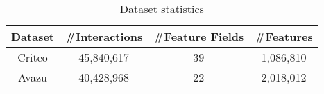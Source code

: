 \begin{table}[t]
    \caption{Dataset statistics}
    \centering
    \vspace{-0.2cm}
    \setlength{\tabcolsep}{1mm}
    \begin{tabular}{c|c|c|c}
        \toprule
        \textbf{Dataset} & \textbf{\#Interactions} & \textbf{\#Feature Fields} & \textbf{\#Features} \\
        \midrule
        Criteo & 45,840,617 & 39 & 1,086,810 \\
        Avazu & 40,428,968 & 22 & 2,018,012 \\
        \bottomrule
    \end{tabular}
    \label{tab:dataset}
\end{table}